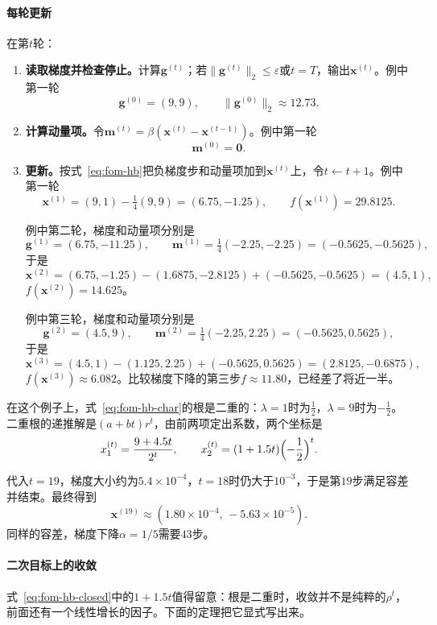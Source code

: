 \paragraph{每轮更新}
在第$t$轮：
\begin{enumerate}
 \item \textbf{读取梯度并检查停止。}计算$\bm{g}^{(t)}$；若$\lVert\bm{g}^{(t)}\rVert_2\leq\varepsilon$或$t=T$，输出$\bm{x}^{(t)}$。例中第一轮
 \[
  \bm{g}^{(0)}=(9,9),\qquad\lVert\bm{g}^{(0)}\rVert_2\approx12.73.
 \]
 \item \textbf{计算动量项。}令$\bm{m}^{(t)}=\beta(\bm{x}^{(t)}-\bm{x}^{(t-1)})$。例中第一轮
 \[
  \bm{m}^{(0)}=\bm{0}.
 \]
 \item \textbf{更新。}按式~\eqref{eq:fom-hb}把负梯度步和动量项加到$\bm{x}^{(t)}$上，令$t\leftarrow t+1$。例中第一轮
 \[
  \bm{x}^{(1)}=(9,1)-\tfrac14(9,9)=(6.75,-1.25),\qquad f(\bm{x}^{(1)})=29.8125.
 \]

 例中第二轮，梯度和动量项分别是
 \[
  \bm{g}^{(1)}=(6.75,-11.25),\qquad\bm{m}^{(1)}=\tfrac14(-2.25,-2.25)=(-0.5625,-0.5625),
 \]
 于是
 \[
  \bm{x}^{(2)}=(6.75,-1.25)-(1.6875,-2.8125)+(-0.5625,-0.5625)=(4.5,1),
 \]
 $f(\bm{x}^{(2)})=14.625$。

 例中第三轮，梯度和动量项分别是
 \[
  \bm{g}^{(2)}=(4.5,9),\qquad\bm{m}^{(2)}=\tfrac14(-2.25,2.25)=(-0.5625,0.5625),
 \]
 于是
 \[
  \bm{x}^{(3)}=(4.5,1)-(1.125,2.25)+(-0.5625,0.5625)=(2.8125,-0.6875),
 \]
 $f(\bm{x}^{(3)})\approx6.082$。比较梯度下降的第三步$f\approx11.80$，已经差了将近一半。
\end{enumerate}

在这个例子上，式~\eqref{eq:fom-hb-char}的根是二重的：$\lambda=1$时为$\tfrac12$，$\lambda=9$时为$-\tfrac12$。二重根的递推解是$(a+bt)r^t$，由前两项定出系数，两个坐标是
\begin{equation}
 x_1^{(t)}=\frac{9+4.5t}{2^t},\qquad x_2^{(t)}=(1+1.5t)\Bigl(-\frac12\Bigr)^t.
 \label{eq:fom-hb-closed}
\end{equation}

代入$t=19$，梯度大小约为$5.4\times10^{-4}$，$t=18$时仍大于$10^{-3}$，于是第$19$步满足容差并结束。最终得到
\[
 \bm{x}^{(19)}\approx(1.80\times10^{-4},\,-5.63\times10^{-5}).
\]
同样的容差，梯度下降$\alpha=1/5$需要$43$步。

\paragraph{二次目标上的收敛}
式~\eqref{eq:fom-hb-closed}中的$1+1.5t$值得留意：根是二重时，收敛并不是纯粹的$\rho^t$，前面还有一个线性增长的因子。下面的定理把它显式写出来。

